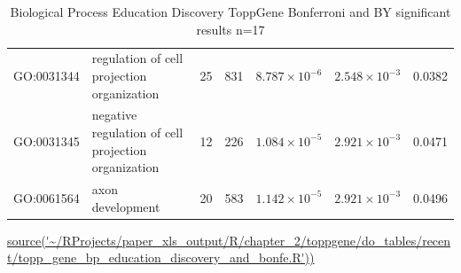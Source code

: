 \begin{table}[ht]
\begin{adjustbox}{width=\textwidth}
\begin{tabular}{lllllll}
  GO:0031344 & regulation of cell projection organization & 25 & 831 & $8.787 \times 10^{-6}$ & $2.548 \times 10^{-3}$ & 0.0382 \\ 
  GO:0031345 & negative regulation of cell projection organization & 12 & 226 & $1.084 \times 10^{-5}$ & $2.921 \times 10^{-3}$ & 0.0471 \\ 
  GO:0061564 & axon development & 20 & 583 & $1.142 \times 10^{-5}$ & $2.921 \times 10^{-3}$ & 0.0496 \\ 
   \bottomrule
\end{tabular}
\end{adjustbox}
\caption{Biological Process Education Discovery ToppGene Bonferroni and BY significant results n=17} \tiny\url{source('~/RProjects/paper_xls_output/R/chapter_2/toppgene/do_tables/recent/topp_gene_bp_education_discovery_and_bonfe.R'))}
\label{tab:Biological Process Education Discovery ToppGene top10 results BY}
\end{table}
         
            
 
